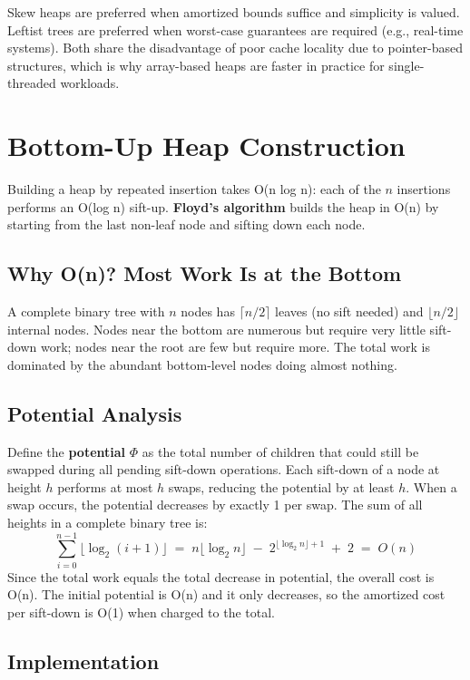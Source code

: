 Skew heaps are preferred when amortized bounds suffice and simplicity is valued. Leftist trees are preferred when worst-case guarantees are required (e.g., real-time systems). Both share the disadvantage of poor cache locality due to pointer-based structures, which is why array-based heaps are faster in practice for single-threaded workloads.

\section{Bottom-Up Heap Construction}

Building a heap by repeated insertion takes O(n log n): each of the $n$ insertions performs an O(log n) sift-up. \textbf{Floyd's algorithm} builds the heap in O(n) by starting from the last non-leaf node and sifting down each node.

\subsection{Why O(n)? Most Work Is at the Bottom}

A complete binary tree with $n$ nodes has $\lceil n/2 \rceil$ leaves (no sift needed) and $\lfloor n/2 \rfloor$ internal nodes. Nodes near the bottom are numerous but require very little sift-down work; nodes near the root are few but require more. The total work is dominated by the abundant bottom-level nodes doing almost nothing.

\subsection{Potential Analysis}

Define the \textbf{potential} $\Phi$ as the total number of children that could still be swapped during all pending sift-down operations. Each sift-down of a node at height $h$ performs at most $h$ swaps, reducing the potential by at least $h$. When a swap occurs, the potential decreases by exactly 1 per swap. The sum of all heights in a complete binary tree is:
\[
  \sum_{i=0}^{n-1} \lfloor \log_2(i+1) \rfloor \;=\; n \lfloor \log_2 n \rfloor \;-\; 2^{\lfloor \log_2 n \rfloor + 1} \;+\; 2 \;=\; O(n)
\]
Since the total work equals the total decrease in potential, the overall cost is O(n). The initial potential is O(n) and it only decreases, so the amortized cost per sift-down is O(1) when charged to the total.

\subsection{Implementation}

